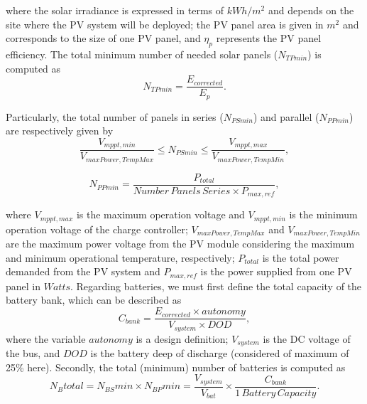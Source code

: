 \documentclass[10pt,conference]{IEEEtran}
\begin{document}
\noindent where the solar irradiance is expressed in terms of $kWh/m^{2}$ and depends on the site where the PV system will be deployed; 
the PV panel area is given in $m^{2}$ and corresponds to the size of one PV panel, and $\eta_{p}$ represents the PV panel efficiency.
%
The total minimum number of needed solar panels ($N_{TPmin}$) is computed as
%
\begin{equation}
\label{eq:NTPmin}
\scriptstyle N_{TPmin} = \dfrac{\scriptstyle E_{corrected}}{\scriptstyle E_{p}}.
\end{equation}

Particularly, the total number of panels in series ($N_{PSmin}$) and parallel ($N_{PPmin}$) are respectively given by
%
\begin{equation}
\label{eq:NPSmin}
\dfrac{\scriptstyle V_{mppt,min}}{\scriptstyle V_{maxPower,TempMax}} \scriptstyle \leq \scriptstyle N_{PSmin} \leq \dfrac{\scriptstyle V_{mppt,max}}{\scriptstyle V_{maxPower,TempMin}},
\end{equation}

\begin{equation}
\label{eq:NPPmin}
\scriptstyle N_{PPmin} = \dfrac{\scriptstyle P_{total}}{\scriptstyle Number\,Panels\,Series \scriptstyle \times \scriptstyle P_{max,ref}},
\end{equation}

\noindent where $V_{mppt,max}$ is the maximum operation voltage and $V_{mppt,min}$ is the minimum operation voltage of the charge controller; $V_{maxPower,TempMax}$ and $V_{maxPower,TempMin}$ are the maximum power voltage from the PV module considering the maximum and minimum operational temperature, respectively; $P_{total}$ is the total power demanded from the PV system and $P_{max,ref}$ is the power supplied from one PV panel in $Watts$.
%
Regarding batteries, we must first define the total capacity of the battery bank, which can be described as
\begin{equation}
\label{eq:Cbank}
\scriptstyle C_{bank} \scriptstyle = \dfrac{\scriptstyle E_{corrected} \scriptstyle \times \scriptstyle autonomy}{\scriptstyle V_{system} \scriptstyle \times \scriptstyle DOD},
\end{equation}
%
\noindent where the variable $autonomy$ is a design definition; %
$ V_{system} $ is the DC voltage of the bus, and $ DOD $ is the battery deep of discharge (considered of maximum of 25\% here).
%
Secondly, the total (minimum) number of batteries is computed as 
\begin{equation}
\label{eq:Nbtotal}
\scriptstyle N_{B}total = \scriptstyle N_{BS}min \scriptstyle \times \scriptstyle N_{BP}min = \dfrac{\scriptstyle V_{system}}{\scriptstyle V_{bat}} \scriptstyle \times \dfrac{\scriptstyle C_{bank}}{\scriptstyle 1 \,Battery \, Capacity}.
\end{equation}
\end{document}
